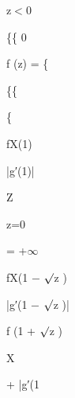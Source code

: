 \documentclass[a4paper,portrait,12pt]{article}
\begin{document}
\begin{flushleft}
z$<$0
\end{flushleft}





\{\{ 0


\begin{flushleft}
f (z) = \{
\end{flushleft}


\{\{


\{





\begin{flushleft}
fX(1)
\end{flushleft}


\begin{flushleft}
|g′(1)|
\end{flushleft}





\begin{flushleft}
Z
\end{flushleft}





\begin{flushleft}
z=0
\end{flushleft}





= +$\infty$





\begin{flushleft}
fX(1 $-$ $\surd$z )
\end{flushleft}


\begin{flushleft}
|g′(1 $-$ $\surd$z )|
\end{flushleft}





\begin{flushleft}
f (1 + $\surd$z )
\end{flushleft}





\begin{flushleft}
X
\end{flushleft}


\begin{flushleft}
+ |g′(1
\end{flushleft}
\end{document}
